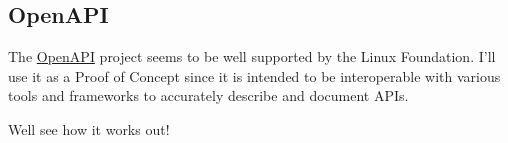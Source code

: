 \subsection{OpenAPI}

The \href{https://www.openapis.org/}{OpenAPI} project seems to be well supported
by the Linux Foundation.  I'll use it as a Proof of Concept since it is intended
to be interoperable with various tools and frameworks to accurately describe and
document APIs.

Well see how it works out!